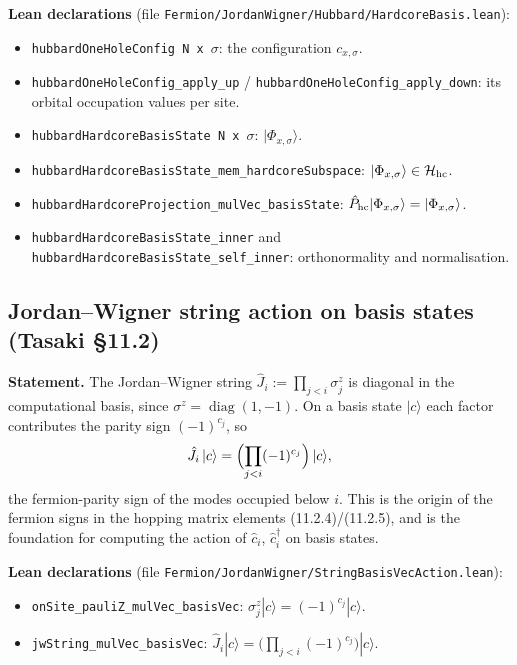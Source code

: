 \documentclass[a4paper,11pt]{article}
\begin{document}
\medskip
\noindent\textbf{Lean declarations}
(file \texttt{Fermion/JordanWigner/Hubbard/HardcoreBasis.lean}):
\begin{itemize}
  \item \texttt{hubbardOneHoleConfig N x }\(\sigma\): the configuration
    \(c_{x,\sigma}\).
  \item \texttt{hubbardOneHoleConfig\_apply\_up} /
    \texttt{hubbardOneHoleConfig\_apply\_down}: its orbital occupation
    values per site.
  \item \texttt{hubbardHardcoreBasisState N x }\(\sigma\):
    \(|\Phi_{x,\sigma}\rangle\).
  \item \texttt{hubbardHardcoreBasisState\_mem\_hardcoreSubspace}:
    \(|\Phi_{x,\sigma}\rangle\in\mathcal H_{\rm hc}\).
  \item \texttt{hubbardHardcoreProjection\_mulVec\_basisState}:
    \(\hat P_{\rm hc}|\Phi_{x,\sigma}\rangle = |\Phi_{x,\sigma}\rangle\).
  \item \texttt{hubbardHardcoreBasisState\_inner} and
    \texttt{hubbardHardcoreBasisState\_self\_inner}: orthonormality and
    normalisation.
\end{itemize}

\subsection{Jordan--Wigner string action on basis states (Tasaki §11.2)}
\label{subsec:jwstring-basisvec}

\noindent\textbf{Statement.}
The Jordan--Wigner string \(\hat J_i := \prod_{j<i}\sigma^z_j\) is diagonal in
the computational basis, since \(\sigma^z = \operatorname{diag}(1,-1)\). On a
basis state \(|c\rangle\) each factor contributes the parity sign
\((-1)^{c_j}\), so
\[
  \hat J_i\,|c\rangle = \Bigl(\prod_{j<i}(-1)^{c_j}\Bigr)\,|c\rangle,
\]
the fermion-parity sign of the modes occupied below \(i\). This is the origin
of the fermion signs in the hopping matrix elements (11.2.4)/(11.2.5), and is
the foundation for computing the action of \(\hat c_i\), \(\hat c_i^\dagger\) on
basis states.

\medskip
\noindent\textbf{Lean declarations}
(file \texttt{Fermion/JordanWigner/StringBasisVecAction.lean}):
\begin{itemize}
  \item \texttt{onSite\_pauliZ\_mulVec\_basisVec}:
    \(\sigma^z_j|c\rangle = (-1)^{c_j}|c\rangle\).
  \item \texttt{jwString\_mulVec\_basisVec}:
    \(\hat J_i|c\rangle = \bigl(\prod_{j<i}(-1)^{c_j}\bigr)|c\rangle\).
\end{itemize}
\end{document}
